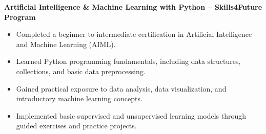 \documentclass[10pt, letterpaper]{article}
\newenvironment{highlights}{
    \begin{itemize}[
        topsep=0.10 cm,
        parsep=0.10 cm,
        partopsep=0pt,
        itemsep=0pt,
        leftmargin=0.4 cm + 10pt
    ]
}{
    \end{itemize}
} %
\begin{document}
\textbf{Artificial Intelligence \& Machine Learning with Python – Skills4Future Program}
\begin{highlights}
    \item Completed a beginner-to-intermediate certification in Artificial Intelligence and Machine Learning (AIML).
    \item Learned Python programming fundamentals, including data structures, collections, and basic data preprocessing.
    \item Gained practical exposure to data analysis, data visualization, and introductory machine learning concepts.
    \item Implemented basic supervised and unsupervised learning models through guided exercises and practice projects.
\end{highlights}
\end{document}
